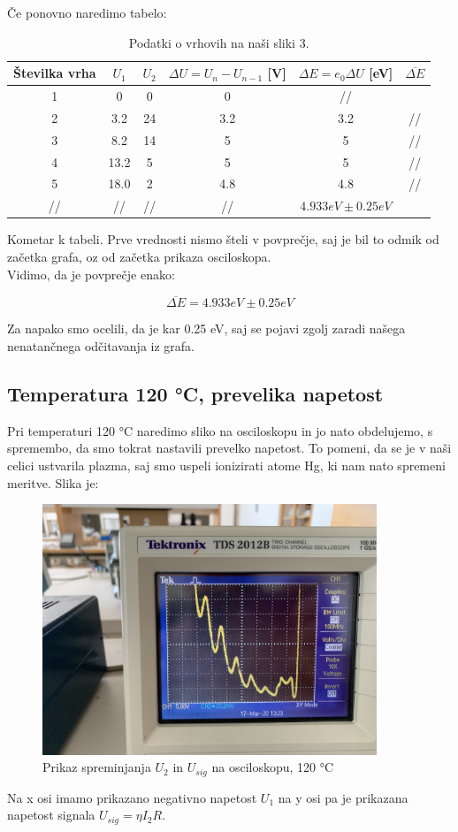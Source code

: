 \documentclass[11pt, a4paper]{article}
\theoremstyle{definition}
\theoremstyle{example}
\theoremstyle{izrek}
\begin{document}
Če ponovno naredimo tabelo: 
\begin{table}[h]
	\centering
	\begin{tabular}{|c|c|c|c|c|c|}
		\hline
		
		Številka vrha & $U_1$ & $U_2$ & $\Delta U = U_{n}- U_{n-1}$ [V] & $\Delta E= e_0\Delta U $ [eV] & $\overline{\Delta E}$\\
		\hline
		\hline
		1 & 0 & 0 & 0 & //\\
		\hline
		2 & 3.2 & 24 & 3.2 & 3.2 &// \\
		\hline
		3 & 8.2 & 14 & 5 & 5 & //\\
		\hline
		4 & 13.2 & 5 & 5 & 5 & //\\
		\hline
		5 & 18.0 & 2 & 4.8 & 4.8 &//\\
		\hline
		//& //& //&// & $4.933 eV \pm 0.25 eV$\\ 
		\hline
		\hline
	\end{tabular}
	\caption{Podatki o vrhovih na naši sliki 3.}		\label{120 °C}
\end{table}
Kometar k tabeli. Prve vrednosti nismo šteli v povprečje, saj je bil to odmik od začetka grafa, oz od začetka prikaza osciloskopa. \\
Vidimo, da je povprečje enako: 

$$\overline{\Delta E}=4.933 eV \pm 0.25 eV$$

Za napako smo ocelili, da je kar 0.25 eV, saj se pojavi zgolj zaradi našega nenatančnega odčitavanja iz grafa.

\pagebreak
\subsection{Temperatura 120 °C, prevelika napetost}
Pri temperaturi 120 °C naredimo sliko na osciloskopu in jo nato obdelujemo, s spremembo, da smo tokrat nastavili prevelko napetost. To pomeni, da se je v naši celici ustvarila plazma, saj smo uspeli ionizirati atome Hg, ki nam nato spremeni meritve. Slika je: 

\begin{figure}[H]
    \centering
    \includegraphics[width=10cm]{T=120_prevelika_napetost.jpg}
    \caption{Prikaz spreminjanja $U_2$ in $U_{sig}$ na osciloskopu, 120 °C}
\end{figure}
Na x osi imamo prikazano negativno napetost $U_1$ na y osi pa je prikazana napetost signala $U_{sig}=\eta I_2 R.$
\end{document}
